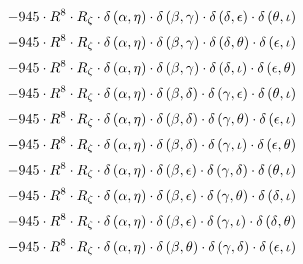 \begin{subequations}
\begin{gather}
 \\[0.2em] \notag 		 - 945 \cdot R^{8} \cdot R_{\zeta{}} \cdot \delta{}\left(\alpha{}, \eta{}\right) \cdot \delta{}\left(\beta{}, \gamma{}\right) \cdot \delta{}\left(\delta{}, \epsilon{}\right) \cdot \delta{}\left(\theta{}, \iota{}\right) 
 \\[0.2em] \notag 		 - 945 \cdot R^{8} \cdot R_{\zeta{}} \cdot \delta{}\left(\alpha{}, \eta{}\right) \cdot \delta{}\left(\beta{}, \gamma{}\right) \cdot \delta{}\left(\delta{}, \theta{}\right) \cdot \delta{}\left(\epsilon{}, \iota{}\right) 
 \\[0.2em] \notag 		 - 945 \cdot R^{8} \cdot R_{\zeta{}} \cdot \delta{}\left(\alpha{}, \eta{}\right) \cdot \delta{}\left(\beta{}, \gamma{}\right) \cdot \delta{}\left(\delta{}, \iota{}\right) \cdot \delta{}\left(\epsilon{}, \theta{}\right) 
 \\[0.2em] \notag 		 - 945 \cdot R^{8} \cdot R_{\zeta{}} \cdot \delta{}\left(\alpha{}, \eta{}\right) \cdot \delta{}\left(\beta{}, \delta{}\right) \cdot \delta{}\left(\gamma{}, \epsilon{}\right) \cdot \delta{}\left(\theta{}, \iota{}\right) 
 \\[0.2em] \notag 		 - 945 \cdot R^{8} \cdot R_{\zeta{}} \cdot \delta{}\left(\alpha{}, \eta{}\right) \cdot \delta{}\left(\beta{}, \delta{}\right) \cdot \delta{}\left(\gamma{}, \theta{}\right) \cdot \delta{}\left(\epsilon{}, \iota{}\right) 
 \\[0.2em] \notag 		 - 945 \cdot R^{8} \cdot R_{\zeta{}} \cdot \delta{}\left(\alpha{}, \eta{}\right) \cdot \delta{}\left(\beta{}, \delta{}\right) \cdot \delta{}\left(\gamma{}, \iota{}\right) \cdot \delta{}\left(\epsilon{}, \theta{}\right) 
 \\[0.2em] \notag 		 - 945 \cdot R^{8} \cdot R_{\zeta{}} \cdot \delta{}\left(\alpha{}, \eta{}\right) \cdot \delta{}\left(\beta{}, \epsilon{}\right) \cdot \delta{}\left(\gamma{}, \delta{}\right) \cdot \delta{}\left(\theta{}, \iota{}\right) 
 \\[0.2em] \notag 		 - 945 \cdot R^{8} \cdot R_{\zeta{}} \cdot \delta{}\left(\alpha{}, \eta{}\right) \cdot \delta{}\left(\beta{}, \epsilon{}\right) \cdot \delta{}\left(\gamma{}, \theta{}\right) \cdot \delta{}\left(\delta{}, \iota{}\right) 
 \\[0.2em] \notag 		 - 945 \cdot R^{8} \cdot R_{\zeta{}} \cdot \delta{}\left(\alpha{}, \eta{}\right) \cdot \delta{}\left(\beta{}, \epsilon{}\right) \cdot \delta{}\left(\gamma{}, \iota{}\right) \cdot \delta{}\left(\delta{}, \theta{}\right) 
 \\[0.2em] \notag 		 - 945 \cdot R^{8} \cdot R_{\zeta{}} \cdot \delta{}\left(\alpha{}, \eta{}\right) \cdot \delta{}\left(\beta{}, \theta{}\right) \cdot \delta{}\left(\gamma{}, \delta{}\right) \cdot \delta{}\left(\epsilon{}, \iota{}\right) 

\end{gather}
\end{subequations}
